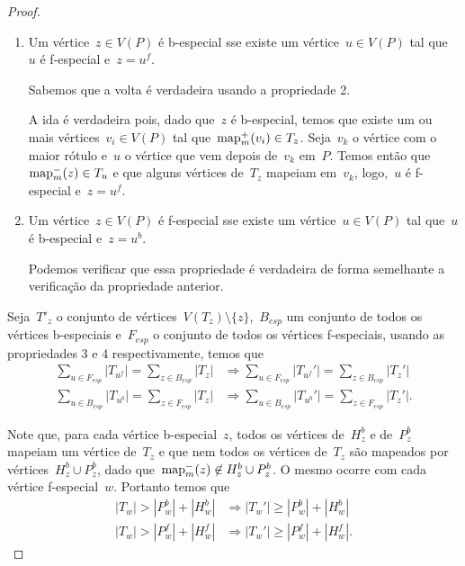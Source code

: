 \begin{proof}
\begin{enumerate}
		\item Um vértice~${z\in V(P)}$ é b-especial sse existe um
		vértice~${u\in V(P)}$ tal que~$u$ é f-especial e~${z=u^f}$.

		Sabemos que a volta é verdadeira usando a propriedade 2.
		
		A ida é verdadeira pois, dado que~$z$ é b-especial,
		temos que existe um ou mais vértices~${v_i\in V(P)}$ tal
		que~${\mathrm{map}^+_m(v_i)\in T_{z}}$.
		Seja~$v_k$ o vértice com o maior rótulo e~$u$ o vértice 
		que vem depois de~$v_k$ em~$P$. 
		Temos então que~${\mathrm{map}^-_m(z)\in T_u}$ e que alguns vértices
		de~$T_z$ mapeiam em~$v_k$, logo,~$u$ é f-especial e~${z=u^f}$.

		\item Um vértice~${z\in V(P)}$ é f-especial sse existe um
		vértice~${u\in V(P)}$ tal que~$u$ é b-especial e~${z=u^b}$.

		Podemos verificar que essa propriedade é verdadeira de forma
		semelhante a verificação da propriedade anterior.
	\end{enumerate}

	Seja~$T'_z$ o conjunto de 
	vértices~${V(T_z)\setminus \{z\}}$,~$B_{esp}$ 
	um conjunto de todos os vértices b-especiais e~$F_{esp}$ o
	conjunto de todos os vértices f-especiais, usando as propriedades 
	3 e 4 respectivamente, temos que
	\begin{align}
		\displaystyle\sum_{u\in F_{esp}}|T_{u^f}| = 
		\displaystyle\sum_{z\in B_{esp}}|T_{z}| %
		&\Rightarrow
		\displaystyle\sum_{u\in F_{esp}}|T_{u^f}'| = 
		\displaystyle\sum_{z\in B_{esp}}|T_{z}'| \label{eq:4}\\
		\displaystyle\sum_{u\in B_{esp}}|T_{u^b}| = 
		\displaystyle\sum_{z\in F_{esp}}|T_{z}| %
		&\Rightarrow
		\displaystyle\sum_{u\in B_{esp}}|T_{u^b}'| = 
		\displaystyle\sum_{z\in F_{esp}}|T_{z}'| \label{eq:3}.
	\end{align}

	Note que, para cada vértice b-especial~$z$, todos os vértices 
	de~$H^b_z$ e de~$P^b_z$ mapeiam um vértice 
	de~$T_z$ e que nem todos os vértices de~$T_z$ são mapeados por
	vértices~$H^b_z\cup P_z^b$, 
	dado que~$\mathrm{map}^-_m(z)\not\in H^b_z\cup P_z^b$.
	O mesmo ocorre com cada vértice f-especial~$w$.
	Portanto temos que
	\begin{align}
		|T_w| > |P^b_w| + |H^b_w| 
		&\Rightarrow
		|T_w'| \ge |P^b_w| + |H^b_w| \label{eq:5}\\
		|T_w| > |P^f_w| + |H^f_w|
		&\Rightarrow
		|T_w'| \ge |P^f_w| + |H^f_w| \label{eq:6}.
	\end{align}


\end{proof}
